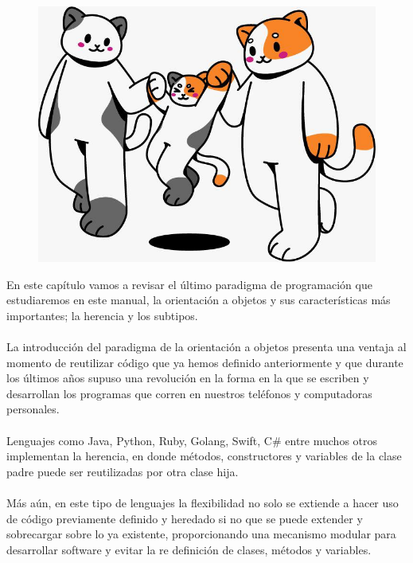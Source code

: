 
\begin{figure}[htbp]
    \centerline{\includegraphics[scale=.5]{assets/10_gatitos_familia.jpg}}
\end{figure}

En este capítulo vamos a revisar el último paradigma de programación que estudiaremos en este manual, la orientación a objetos y sus características más importantes; la herencia y los subtipos.\\\\
La introducción del paradigma de la orientación a objetos presenta una ventaja al momento de reutilizar código que ya hemos definido anteriormente y que durante los últimos años supuso una revolución en la forma en la que se escriben y desarrollan los programas que corren en nuestros teléfonos y computadoras personales.\\\\
Lenguajes como \textsf{Java},  \textsf{Python}, \textsf{Ruby}, \textsf{Golang}, \textsf{Swift}, \textsf{C\#} entre muchos otros implementan la herencia, en donde métodos, constructores y variables de la clase padre puede ser reutilizadas por otra clase hija.\\\\
Más aún, en este tipo de lenguajes la flexibilidad no solo se extiende a hacer uso de código previamente definido y heredado si no que se puede extender y sobrecargar sobre lo ya existente, proporcionando una mecanismo modular para desarrollar software y evitar la re definición de clases, métodos y variables. 

